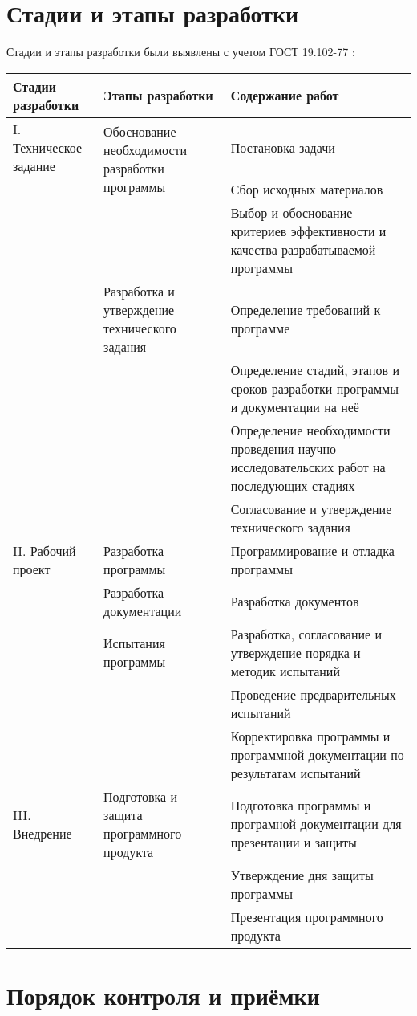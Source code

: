 \documentclass[a4paper, 12pt]{article}
\begin{document}
	\section{Стадии и этапы разработки}\label{section:7}
	Стадии и этапы разработки были выявлены с учетом ГОСТ 19.102-77 \cite{GOST_19.102-77}:
	\begin{table}[ht]
		\begin{tabularx}
			{\textwidth}{|X|X|X|} \hline Стадии разработки & Этапы разработки & Содержание работ \\ \hline I. Техническое задание
			& \multirow{2}{=}{Обоснование необходимости разработки программы} & Постановка задачи \\ & & Сбор исходных материалов \\ & & Выбор
			и обоснование критериев эффективности и качества разрабатываемой программы \\ \cline{2-3} & Разработка и
			утверждение технического задания & Определение требований к программе \\ & & Определение стадий, этапов и сроков
			разработки программы и документации на неё \\ & & Определение необходимости проведения научно-исследовательских работ
			на последующих стадиях \\ & & Согласование и утверждение технического задания \\ \hline II. Рабочий проект &
			Разработка программы & Программирование и отладка программы \\ \cline{2-3} & Разработка документации
			& Разработка документов \\ \cline{2-3} & Испытания
			программы & Разработка, согласование и утверждение порядка и методик испытаний \\ & & Проведение предварительных
			испытаний \\ & & Корректировка программы и программной документации по результатам испытаний \\ \hline III.
			Внедрение & Подготовка и защита программного продукта & Подготовка программы и програмной документации для
			презентации и защиты \\ & & Утверждение дня защиты программы \\ & & Презентация программного продукта \\ \hline
		\end{tabularx}
	\end{table}

	\section{Порядок контроля и приёмки}\label{section:8}
\end{document}
